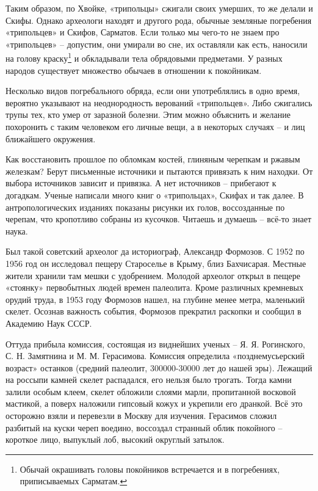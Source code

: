 Таким образом, по Хвойке, «трипольцы» сжигали своих умерших, то же делали и Скифы. Однако археологи находят и другого рода, обычные земляные погребения «трипольцев» и Скифов, Сарматов. Если только мы чего-то не знаем про «трипольцев» – допустим, они умирали во сне, их оставляли как есть, наносили на голову краску\footnote{Обычай окрашивать головы покойников встречается и в погребениях, приписываемых Сарматам.} и обкладывали тела обрядовыми предметами. У разных народов существует множество обычаев в отношении к покойникам.

Несколько видов погребального обряда, если они употреблялись в одно время, вероятно указывают на неоднородность верований «трипольцев». Либо сжигались трупы тех, кто умер от заразной болезни. Этим можно объяснить и желание похоронить с таким человеком его личные вещи, а в некоторых случаях – и лиц ближайшего окружения.

Как восстановить прошлое по обломкам костей, глиняным черепкам и ржавым железкам? Берут письменные источники и пытаются привязать к ним находки. От выбора источников зависит и привязка. А нет источников – прибегают к догадкам. Ученые написали много книг о «трипольцах», Скифах и так далее. В антропологических изданиях показаны рисунки их голов, воссозданные по черепам, что кропотливо собраны из кусочков. Читаешь и думаешь – всё-то знает наука.

Был такой советский археолог да историограф, Александр Формозов. С 1952 по 1956 год он исследовал пещеру Староселье в Крыму, близ Бахчисарая. Местные жители хранили там мешки с удобрением. Молодой археолог открыл в пещере «стоянку» первобытных людей времен палеолита. Кроме различных кремневых орудий труда, в 1953 году Формозов нашел, на глубине менее метра, маленький скелет. Осознав важность события, Формозов прекратил раскопки и сообщил в Академию Наук СССР.

Оттуда прибыла комиссия, состоящая из виднейших ученых – Я. Я. Рогинского, С. Н. Замятнина и М. М. Герасимова. Комиссия определила «позднемусьерский возраст» останков (средний палеолит, 300000-30000 лет до нашей эры). Лежащий на россыпи камней скелет распадался, его нельзя было трогать. Тогда камни залили особым клеем, скелет обложили слоями марли, пропитанной восковой мастикой, а поверх наложили гипсовый кожух и укрепили его дранкой. Всё это осторожно взяли и перевезли в Москву для изучения. Герасимов сложил разбитый на куски череп воедино, воссоздал странный облик покойного – короткое лицо, выпуклый лоб, высокий округлый затылок.

